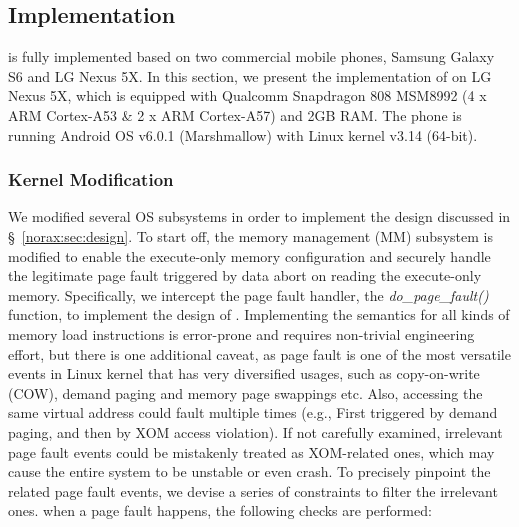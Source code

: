\subsection{Implementation}
\label{norax:sec:impl}
\NORAX is fully implemented based on two commercial mobile phones, Samsung Galaxy S6 and LG Nexus 5X. In this section, we present the implementation of \NORAX on LG Nexus 5X, which is equipped with Qualcomm Snapdragon 808 MSM8992 (4 x ARM Cortex-A53 \& 2 x ARM Cortex-A57) and 2GB RAM. The phone is running Android OS v6.0.1 (Marshmallow) with Linux kernel v3.14 (64-bit). 
\subsubsection{Kernel Modification}
We modified several OS subsystems in order to implement the design discussed in \S~\ref{norax:sec:design}. To start off, the memory management (MM) subsystem is modified to enable the execute-only memory configuration and securely handle the legitimate page fault triggered by data abort on reading the execute-only memory. Specifically, we intercept the page fault handler, the \emph{do\_page\_fault()} function, to implement the design of \emph{\NMonitor}. 
Implementing the semantics for all kinds of memory load instructions is error-prone and requires non-trivial engineering effort, but there is one additional caveat, as page fault is one of the most versatile events in Linux kernel that has very diversified usages, such as copy-on-write (COW), demand paging and memory page swappings etc. Also, accessing the same virtual address could fault multiple times (e.g., First triggered by demand paging, and then by XOM access violation).
If not carefully examined, irrelevant page fault events could be mistakenly treated as XOM-related ones, which may cause the entire system to be unstable or even crash. 
To precisely pinpoint the related page fault events, we devise a series of constraints to filter the irrelevant ones. when a page fault happens, the following checks are performed:
